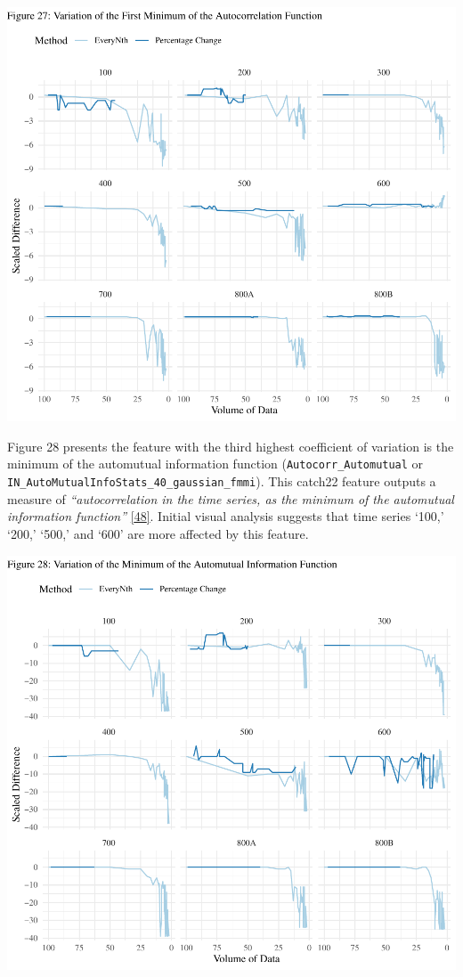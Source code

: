 \documentclass{article}
\begin{document}
\includegraphics{210431461_CSC8639_Dissertation_files/figure-latex/FirstMinimum2-1.pdf}

\newpage

Figure 28 presents the feature with the third highest coefficient of
variation is the minimum of the automutual information function
(\texttt{Autocorr\_Automutual} or
\texttt{IN\_AutoMutualInfoStats\_40\_gaussian\_fmmi}). This catch22
feature outputs a measure of \emph{``autocorrelation in the time series,
as the minimum of the automutual information function''}
\protect\hyperlink{ref-feature_book}{{[}48{]}}. Initial visual analysis
suggests that time series `100,' `200,' `500,' and `600' are more
affected by this feature.

\includegraphics{210431461_CSC8639_Dissertation_files/figure-latex/AutoMutalFunction-1.pdf}
\end{document}
